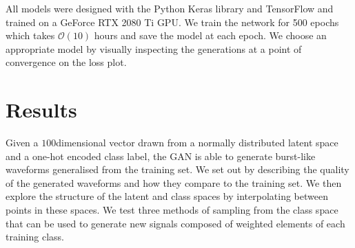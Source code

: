 \documentclass[12pt]{iopart}
\newcommand{\ndimensional}[1]{$#1$\nobreakdash\discretionary{-}{-}{-}dimensional}
\begin{document}
All models were designed with the Python Keras library \cite{chollet2015keras} and TensorFlow \cite{tensorflow2015-whitepaper} and trained on a GeForce RTX 2080 Ti GPU. We train the network for 500 epochs which takes $\mathcal{O}(10)$ hours and save the model at each epoch. We choose an appropriate model by visually inspecting the generations at a point of convergence on the loss plot. 
\section{Results} \label{results}
%
Given a \ndimensional{100} vector drawn from a normally distributed latent space and a one-hot encoded class
label, the GAN is able to generate burst-like waveforms generalised from the
training set. We set out by describing the quality of the generated waveforms and
how they compare to the training set. We then explore the structure of the
latent and class spaces by interpolating between points in these spaces. We
test three methods of sampling from the class space that can be used to generate new signals composed of weighted elements of each training class.
\end{document}
